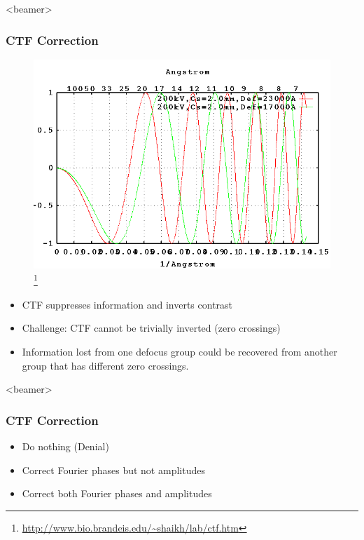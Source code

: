 \documentclass{beamer}
\begin{document}
\begin{frame}<beamer>
\frametitle{CTF Correction}
\begin{figure}[]
 \includegraphics[scale=0.4]{ctf2-ice.png}
 \footnote{\url{http://www.bio.brandeis.edu/~shaikh/lab/ctf.htm}}
\end{figure}


\begin{itemize}[<+->]
\item CTF suppresses information and inverts contrast
\item \alert{Challenge}: CTF cannot be trivially inverted (zero crossings)
\item Information lost from one defocus group could be recovered from another group that has different zero crossings.
\end{itemize}
\end{frame}


\begin{frame}<beamer>
\frametitle{CTF Correction}

\begin{itemize}
\item Do nothing (Denial) 
\item Correct Fourier phases but not amplitudes
\item Correct both Fourier phases and amplitudes 
\end{itemize}
\end{frame}
\end{document}
